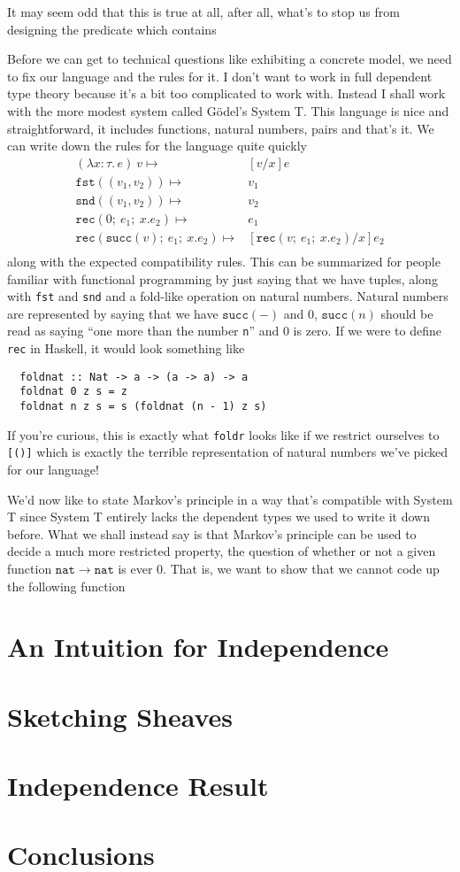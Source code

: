 \documentclass[12pt]{amsart}
\newcommand{\lam}[3]{\lambda #1 : #2.\, #3}
\newcommand{\ap}[2]{#1\ #2}
\newcommand{\prl}[1]{\mathtt{fst}(#1)}
\newcommand{\prr}[1]{\mathtt{snd}(#1)}
\newcommand{\natrec}[3]{\mathtt{rec}(#1;\ #2;\ #3)}
\newcommand{\nat}{\mathtt{nat}}
\renewcommand{\succ}[1]{\mathtt{succ}(#1)}
\begin{document}
It may seem odd that this is true at all, after all, what's to stop us
from designing the predicate which contains


Before we can get to technical questions like exhibiting a concrete
model, we need to fix our language and the rules for it. I don't want
to work in full dependent type theory because it's a bit too
complicated to work with. Instead I shall work with the more modest
system called G\"odel's System T. This language is nice and
straightforward, it includes functions, natural numbers, pairs and that's
it. We can write down the rules for the language quite quickly
\begin{align*}
  \ap{(\lam{x}{\tau}{e})}{v} \mapsto& [v/x]e\\
  \prl{(v_1, v_2)} \mapsto& v_1\\
  \prr{(v_1, v_2)} \mapsto& v_2\\
  \natrec{0}{e_1}{x.e_2} \mapsto& e_1\\
  \natrec{\succ{v}}{e_1}{x.e_2} \mapsto& [\natrec{v}{e_1}{x.e_2}/x]e_2\\
\end{align*}
along with the expected compatibility rules. This can be summarized
for people familiar with functional programming by just saying that we
have tuples, along with {\tt fst} and {\tt snd} and a fold-like
operation on natural numbers. Natural numbers are represented by
saying that we have $\succ{-}$ and $0$, $\succ{n}$ should be read as saying
``one more than the number {\tt n}'' and 0 is zero. If we were to
define {\tt rec} in Haskell, it would look something like
\begin{verbatim}
  foldnat :: Nat -> a -> (a -> a) -> a
  foldnat 0 z s = z
  foldnat n z s = s (foldnat (n - 1) z s)
\end{verbatim}
If you're curious, this is exactly what {\tt foldr} looks like if we
restrict ourselves to {\tt [()]} which is exactly the terrible
representation of natural numbers we've picked for our language!

We'd now like to state Markov's principle in a way that's compatible
with System T since System T entirely lacks the dependent types we
used to write it down before. What we shall instead say is that
Markov's principle can be used to decide a much more restricted
property, the question of whether or not a given function
$\nat \to \nat$ is ever $0$. That is, we want to show that we cannot
code up the following function
\section{An Intuition for Independence}
\section{Sketching Sheaves}
\section{Independence Result}
\section{Conclusions}
\end{document}
